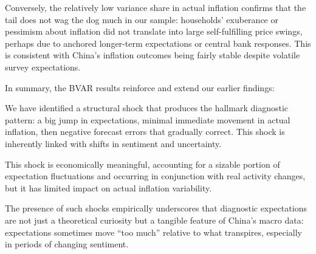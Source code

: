 \documentclass[12pt]{article}
\begin{document}
Conversely, the relatively low variance share in actual inflation confirms that the tail does not wag the dog much in our sample: households' exuberance or pessimism about inflation did not translate into large self-fulfilling price swings, perhaps due to anchored longer-term expectations or central bank responses. This is consistent with China's inflation outcomes being fairly stable despite volatile survey expectations.

In summary, the BVAR results reinforce and extend our earlier findings:

We have identified a structural shock that produces the hallmark diagnostic pattern: a big jump in expectations, minimal immediate movement in actual inflation, then negative forecast errors that gradually correct. This shock is inherently linked with shifts in sentiment and uncertainty.

This shock is economically meaningful, accounting for a sizable portion of expectation fluctuations and occurring in conjunction with real activity changes, but it has limited impact on actual inflation variability.

The presence of such shocks empirically underscores that diagnostic expectations are not just a theoretical curiosity but a tangible feature of China's macro data: expectations sometimes move “too much” relative to what transpires, especially in periods of changing sentiment.
\end{document}
